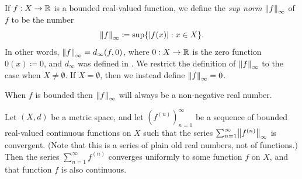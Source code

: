\setcounter{thm}{4}
\begin{defn}\label{ii:3.5.5}
  If \(f : X \to \R\) is a bounded real-valued function, we define the \emph{sup norm} \(\norm*{f}_\infty\) of \(f\) to be the number
  \[
    \norm*{f}_\infty \coloneqq \sup\set{\abs{f(x)} : x \in X}.
  \]
  In other words, \(\norm*{f}_\infty = d_\infty(f, 0)\), where \(0 : X \to \R\) is the zero function \(0(x) \coloneqq 0\), and \(d_\infty\) was defined in .
  We restrict the definition of \(\norm*{f}_\infty\) to the case when \(X \neq \emptyset\).
  If \(X = \emptyset\), then we instead define \(\norm*{f}_\infty = 0\).
\end{defn}

\begin{note}
  When \(f\) is bounded then \(\norm*{f}_\infty\) will always be a non-negative real number.
\end{note}

\setcounter{thm}{6}
\begin{thm}\label{ii:3.5.7}
  Let \((X, d)\) be a metric space, and let \((f^{(n)})_{n = 1}^\infty\) be a sequence of bounded real-valued continuous functions on \(X\) such that the series \(\sum_{n = 1}^\infty \norm*{f^{(n)}}_\infty\) is convergent.
  (Note that this is a series of plain old real numbers, not of functions.)
  Then the series \(\sum_{n = 1}^\infty f^{(n)}\) converges uniformly to some function \(f\) on \(X\), and that function \(f\) is also continuous.
\end{thm}

